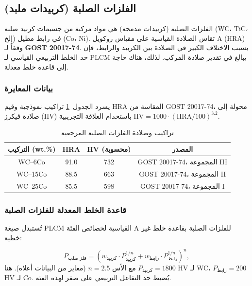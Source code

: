 \documentclass[12pt,a4paper]{article}
\begin{document}
	
	\subsection{الفلزات الصلبة (كربيدات ملبد)}
	\label{subsec:hardmetals}
	
	الفلزات الصلبة (كربيدات مدمجة) هي مواد مركبة من جسيمات كربيد صلبة (WC، TiC، إلخ) في رابط مطيل (Co، Ni). تقاس الصلادة القياسية على مقياس روكويل A (HRA) وفقاً لـ \textbf{GOST 20017-74}. بسبب الاختلاف الكبير في الصلادة بين الكربيد والرابط، فإن حد الخلط التربيعي القياسي لـ PLCM يبالغ في تقدير صلادة المركب. لذلك، هناك حاجة إلى قاعدة خلط معدلة.
	
	\subsubsection{بيانات المعايرة}
	يسرد الجدول~\ref{tab:hardmetal_compositions} تراكيب نموذجية وقيم HRA المقاسة من GOST 20017-74، محولة إلى صلادة فيكرز (HV) باستخدام العلاقة التجريبية \(\text{HV} = 1000 \cdot (\text{HRA}/100)^{3.2}\).
	
	\begin{table}[htbp]
		\centering
		\caption{تراكيب وصلادة الفلزات الصلبة المرجعية}
		\label{tab:hardmetal_compositions}
		\begin{tabular}{cccc}
			\toprule
			\textbf{التركيب (wt.\%)} & \textbf{HRA} & \textbf{HV (محسوبة)} & \textbf{المصدر} \\
			\midrule
			WC–6Co & 91.0 & 732 & GOST 20017-74، المجموعة III \\
			WC–15Co & 88.5 & 663 & GOST 20017-74، المجموعة II \\
			WC–25Co & 85.5 & 598 & GOST 20017-74، المجموعة I \\
			\bottomrule
		\end{tabular}
	\end{table}
	
	\subsubsection{قاعدة الخلط المعدلة للفلزات الصلبة}
	تُستبدل صيغة PLCM القياسية لخصائص الفئة A للفلزات الصلبة بقاعدة خلط غير خطية:
	
	\[
	P_{\text{فلز صلب}} = \left( w_{\text{كربيد}} \cdot P_{\text{كربيد}}^{1/n} + w_{\text{رابط}} \cdot P_{\text{رابط}}^{1/n} \right)^{n},
	\]
	مع الأس \(n = 2.5\) (معاير من البيانات أعلاه). هنا \(P_{\text{كربيد}} = 1800\) HV لـ WC، \(P_{\text{رابط}} = 200\) HV لـ Co. يُضبط حد التفاعل التربيعي على صفر لهذه الفئة.
	
\end{document}
